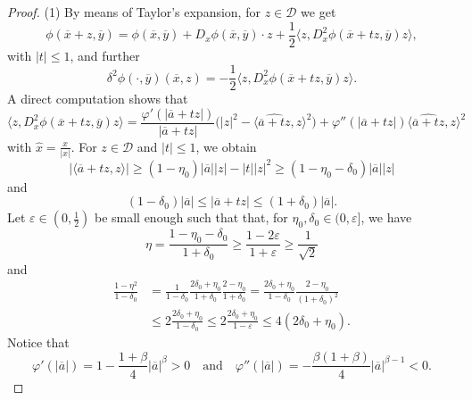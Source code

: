 \documentclass[11pt,reqno]{amsart}
\numberwithin{equation}{section}
\begin{document}
\begin{proof}
(1) By means of Taylor's expansion, for $z\in \mathcal{D}$ we get
$$
\phi(\overline{x}+z,\overline{y})=\phi(\overline{x},\overline{y})+D_x\phi(\overline{x},\overline{y})\cdot z+\frac{1}{2}\langle z,D^2_x\phi(\overline{x}+tz,\overline{y})z\rangle,
$$
with $|t|\le 1$, and further
$$
\delta^2\phi(\cdot,\overline{y})(\overline{x},z)=-\frac{1}{2}\langle z,D^2_x\phi(\overline{x}+tz,\overline{y})z\rangle.
$$
A direct computation shows that
\begin{equation}
\label{2-2}
\langle z,D^2_x\phi(\overline{x}+tz,\overline{y})z\rangle
=\frac{\varphi'(|\overline{a}+tz|)}{|\overline{a}+tz|}\bigl(|z|^2-\langle\widehat{\overline{a}+tz},z\rangle^2\bigr)
+\varphi''(|\overline{a}+tz|)\langle\widehat{\overline{a}+tz},z\rangle^2
\end{equation}
with $\hat{x}=\frac{x}{|x|}$. For $z\in\mathcal{D}$ and $|t|\le 1$, we obtain
\begin{equation}
\label{2-3}
|\langle\overline{a}+tz,z\rangle|\ge(1-\eta_0)|\overline{a}||z|-|t||z|^2\ge(1-\eta_0-\delta_0)|\overline{a}||z|
\end{equation}
and
\begin{equation}
\label{2-4}
(1-\delta_0)|\overline{a}|\le |\overline{a}+tz|\le(1+\delta_0)|\overline{a}|.
\end{equation}
Let $\varepsilon\in\left(0,\frac{1}{2}\right)$ be small enough such that that, for $\eta_0,\delta_0\in(0,\varepsilon]$, we have
$$
\eta=\frac{1-\eta_0-\delta_0}{1+\delta_0}\ge\frac{1-2\varepsilon}{1+\varepsilon}\ge\frac{1}{\sqrt{2}}
$$
and
\begin{align*}
\frac{1-\eta^2}{1-\delta_0}
&=\frac{1}{1-\delta_0}\frac{2\delta_0+\eta_0}{1+\delta_0}\frac{2-\eta_0}{1+\delta_0}
=\frac{2\delta_0+\eta_0}{1-\delta_0}\frac{2-\eta_0}{(1+\delta_0)^2}\\
&\le2\frac{2\delta_0+\eta_0}{1-\delta_0}\le2\frac{2\delta_0+\eta_0}{1-\varepsilon}\le4(2\delta_0+\eta_0).
\end{align*}
Notice that
$$
\varphi'(|\overline{a}|)=1-\frac{1+\beta}{4}|\overline{a}|^\beta>0 \quad \text{and}\quad \varphi''(|\overline{a}|)=-\frac{\beta(1+\beta)}{4}|\overline{a}|^{\beta-1}<0.
$$


\end{proof}
\end{document}
